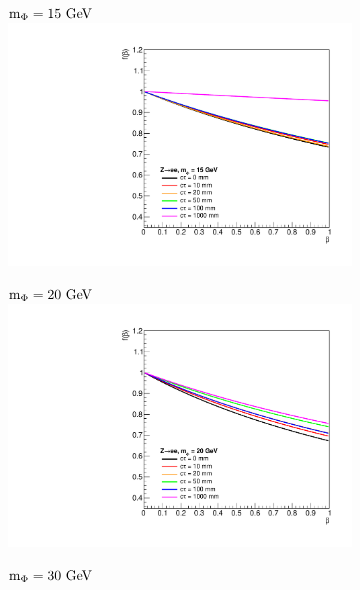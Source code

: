 \begin{figure}[htb!]
	\centering
	\captionsetup[subfigure]{justification=centering}
	\begin{subfigure}{0.3\linewidth}
		\centering
		$\mphi=15\unit{GeV}$
		\includegraphics[width=\linewidth]{figs/05_analysis/BR_Z_ELE_15.pdf}
	\end{subfigure}
	\begin{subfigure}{0.3\linewidth}
		\centering
		$\mphi=20\unit{GeV}$
		\includegraphics[width=\linewidth]{figs/05_analysis/BR_Z_ELE_20.pdf}
	\end{subfigure}
	\begin{subfigure}{0.3\linewidth}
		\centering
		$\mphi=30\unit{GeV}$

\end{subfigure}
\end{figure}
